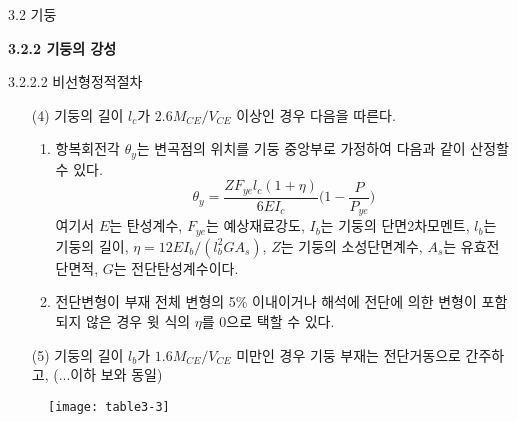 \begin{frame}{3.2 기둥}

	\textbf{3.2.2 기둥의 강성}

3.2.2.2 비선형정적절차

\begin{enumerate}
	\item[(4)] 기둥의 길이 $l_c$가 $2.6M_{CE}/V_{CE}$ 이상인 경우 다음을 따른다. 
	\begin{enumerate}[label=\large\protect\textcircled{\small\arabic*}]
		\item 항복회전각 $\theta_y$는 변곡점의 위치를 기둥 중앙부로 가정하여 다음과 같이 산정할 수 있다. 
		\[\theta_y = \frac{ZF_{ye}l_ c(1+\eta)}{6EI_c}\Big(1 - \frac{P}{P_{ye}}\Big)\]
		\noindent 여기서 $E$는 탄성계수, $F_{ye}$는 예상재료강도, $I_b$는 기둥의 단면2차모멘트, $l_b$는 기둥의 길이, $\eta=12EI_b/(l_b^2GA_s)$, $Z$는 기둥의 소성단면계수, $A_s$는 유효전단면적, $G$는 전단탄성계수이다. 
		\item 전단변형이 부재 전체 변형의 5\% 이내이거나 해석에 전단에 의한 변형이 포함되지 않은 경우 윗 식의 $\eta$를 0으로 택할 수 있다. 
	\end{enumerate}
	\item[(5)] 기둥의 길이 $l_b$가 $1.6M_{CE}/V_{CE}$ 미만인 경우 기둥 부재는 전단거동으로 간주하고, (...이하 보와 동일)
\end{enumerate}
\end{frame}

%
%
%
%
%


\begin{frame}
	\begin{figure}
		\centering
		\texttt{[image: table3-3]}
	\end{figure}
\end{frame}


